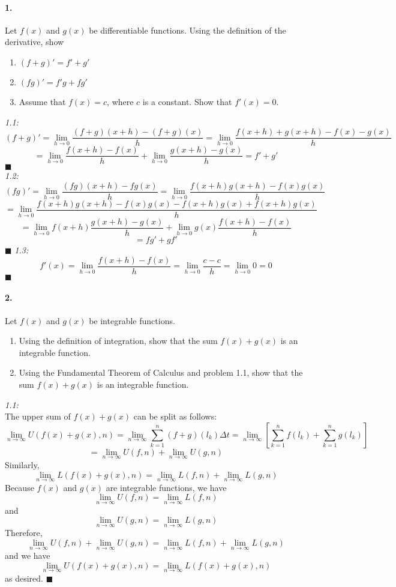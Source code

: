 \documentclass[10pt,a4paper]{article}
\begin{document}
\paragraph{1.} Let $f(x)$ and $g(x)$ be differentiable functions. Using the definition of the derivative, show 
\begin{enumerate}
\item $(f+g)' = f'+g'$
\item $(fg)' = f'g + fg'$
\item Assume that $f(x) = c$, where $c$ is a constant. Show that $f'(x) = 0$.
\end{enumerate}
\begin{flushleft}
\textit{1.1:}\\
$$(f+g)'  =  \lim_{h \to 0} \frac{(f+g)(x+h)-(f+g)(x)}{h} = \lim_{h \to 0} \frac{f(x+h)+g(x+h)-f(x)-g(x)}{h}$$
$$ = \lim_{h \to 0} \frac{f(x+h)-f(x)}{h}+ \lim_{h \to 0} \frac{g(x+h)-g(x)}{h} = f'+g'$$
$\blacksquare$\\
\textit{1.2:}\\
$$ (fg)' = \lim_{h \to 0} \frac{(fg)(x+h) - fg(x)}{h} = \lim_{h \to 0} \frac{f(x+h)g(x+h) - f(x)g(x)}{h}$$
$$  = \lim_{h \to 0} \frac{f(x+h)g(x+h) - f(x)g(x)-f(x+h)g(x)+f(x+h)g(x)}{h} $$
$$ = \lim_{h \to 0} f(x+h)\frac{g(x+h)-g(x)}{h} + \lim_{h \to 0} g(x) \frac{f(x+h)-f(x)}{h}$$
$$  = fg' + gf'$$
$\blacksquare$
\textit{1.3:}\\
$$f'(x) = \lim_{h \to 0} \frac{f(x+h)-f(x)}{h} = \lim_{h \to 0} \frac{c-c}{h} = \lim_{h \to 0} 0 = 0$$
$\blacksquare$
\end{flushleft}

\paragraph{2.} Let $f(x)$ and $g(x)$ be integrable functions.
\begin{enumerate}
\item Using the definition of integration, show that the sum $f(x)+g(x)$ is an integrable function.
\item Using the Fundamental Theorem of Calculus and problem 1.1, show that the sum $f(x) +g(x)$ is an integrable function.
\end{enumerate}
\begin{flushleft}
\textit{1.1:}\\
The upper sum of $f(x)+g(x)$ can be split as follows:
$$ \lim_{n \to \infty} U(f(x)+g(x),n) =  \lim_{n \to \infty} \sum_{k=1}^n (f+g)(l_k)\Delta t = \lim_{n \to \infty} \left[ \sum_{k=1}^n f(l_k)+ \sum_{k=1}^n g(l_k) \right]$$
$$ = \lim_{n \to \infty}  U(f,n) + \lim_{n \to \infty} U(g,n)$$
Similarly, 
$$ \lim_{n \to \infty} L(f(x)+g(x),n) = \lim_{n \to \infty}  L(f,n) + \lim_{n \to \infty} L(g,n)$$
Because $f(x)$ and $g(x)$ are integrable functions, we have 
$$ \lim_{n \to \infty} U(f,n) = \lim_{n \to \infty} L(f,n)$$
and
$$  \lim_{n \to \infty} U(g,n) = \lim_{n \to \infty} L(g,n)$$
Therefore, 
$$ \lim_{n \to \infty}  U(f,n) + \lim_{n \to \infty} U(g,n) = \lim_{n \to \infty}  L(f,n) + \lim_{n \to \infty} L(g,n)$$
and we have
$$ \lim_{n \to \infty} U(f(x)+g(x),n) = \lim_{n \to \infty} L(f(x)+g(x),n)$$
as desired. $\blacksquare$
\end{flushleft}
\end{document}
